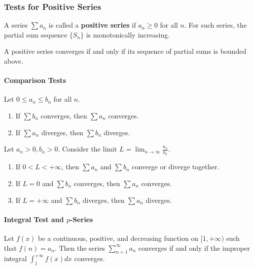 \subsubsection{Tests for Positive Series}

A series $\sum a_n$ is called a \textbf{positive series} if $a_n \ge 0$ for all $n$.
For such series, the partial sum sequence $\{S_n\}$ is monotonically increasing.
\begin{theorem}
A positive series converges if and only if its sequence of partial sums is bounded above.
\end{theorem}

\paragraph{Comparison Tests}
\begin{theorem}
Let $0 \le a_n \le b_n$ for all $n$.
\begin{enumerate}
    \item If $\sum b_n$ converges, then $\sum a_n$ converges.
    \item If $\sum a_n$ diverges, then $\sum b_n$ diverges.
\end{enumerate}
\end{theorem}

\begin{theorem}
Let $a_n > 0, b_n > 0$. Consider the limit $L = \lim_{n \to \infty} \frac{a_n}{b_n}$.
\begin{enumerate}
    \item If $0 < L < +\infty$, then $\sum a_n$ and $\sum b_n$ converge or diverge together.
    \item If $L = 0$ and $\sum b_n$ converges, then $\sum a_n$ converges.
    \item If $L = +\infty$ and $\sum b_n$ diverges, then $\sum a_n$ diverges.
\end{enumerate}
\end{theorem}

\paragraph{Integral Test and $p$-Series}
\begin{theorem}
Let $f(x)$ be a continuous, positive, and decreasing function on $[1, +\infty)$ such that $f(n) = a_n$. Then the series $\sum_{n=1}^{\infty} a_n$ converges if and only if the improper integral $\int_1^{+\infty} f(x) dx$ converges.
\end{theorem}

